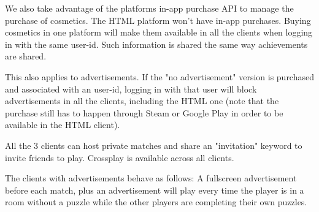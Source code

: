 
We also take advantage of the platforms in-app purchase API to manage the purchase of cosmetics. The HTML platform won't have in-app purchases.
Buying cosmetics in one platform will make them available in all the clients when logging in with the same user-id. Such information is shared the same way achievements are shared.

This also applies to advertisements. If the "no advertisement" version is purchased and associated with an user-id, logging in with that user will block advertisements in all the clients, including the HTML one (note that the purchase still has to happen through Steam or Google Play in order to be available in the HTML client).

All the 3 clients can host private matches and share an "invitation" keyword to invite friends to play. Crossplay is available across all clients.

The clients with advertisements behave as follows:
A fullscreen advertisement before each match, plus an advertisement will play every time the player is in a room without a puzzle while the other players are completing their own puzzles.

\pagebreak 